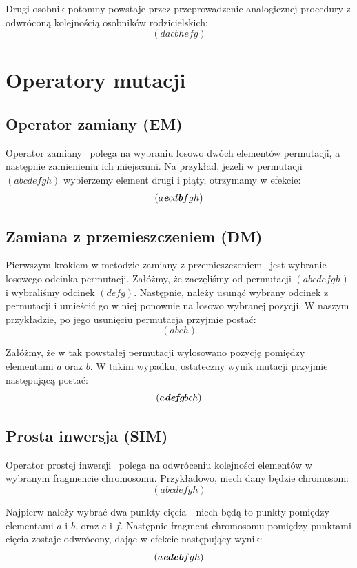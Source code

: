 \documentclass{xmgr}
\begin{document}
Drugi osobnik potomny powstaje przez przeprowadzenie analogicznej procedury z odwróconą kolejnością osobników rodzicielskich:
$$ (d a c b h e f g) $$


\section{Operatory mutacji}

\subsection{Operator zamiany (EM)}

Operator zamiany~\cite{Larranaga99geneticalgorithms} polega na wybraniu losowo dwóch elementów permutacji, a następnie zamienieniu ich miejscami. Na przykład, jeżeli w permutacji $ (a b c d e f g h) $ wybierzemy element drugi i piąty, otrzymamy w efekcie:
$$ (a \textit{\textbf{e}} c d \textit{\textbf{b}} f g h) $$

\subsection{Zamiana z przemieszczeniem (DM)}

Pierwszym krokiem w metodzie zamiany z przemieszczeniem~\cite{Michalewicz:2003:AGSDPE} jest wybranie losowego odcinka permutacji. Załóżmy, że zaczęliśmy od permutacji $ (a b c d e f g h) $ i wybraliśmy odcinek $ (d e f g) $. Następnie, należy usunąć wybrany odcinek z permutacji i umieścić go w niej ponownie na losowo wybranej pozycji. W naszym przykładzie, po jego usunięciu permutacja przyjmie postać:
$$ (a b c h) $$

Załóżmy, że w tak powstałej permutacji wylosowano pozycję pomiędzy elementami $a$ oraz $b$. W takim wypadku, ostateczny wynik mutacji przyjmie następującą postać:
$$ (a \textit{\textbf{defg}} b c h) $$

\subsection{Prosta inwersja (SIM)}

Operator prostej inwersji~\cite{Holland1975} polega na odwróceniu kolejności elementów w wybranym fragmencie chromosomu. Przykładowo, niech dany będzie chromosom:
$$ (a b c d e f g h) $$

Najpierw należy wybrać dwa punkty cięcia - niech będą to punkty pomiędzy elementami $a$ i $b$, oraz $e$ i $f$. Następnie fragment chromosomu pomiędzy punktami cięcia zostaje odwrócony, dając w efekcie następujący wynik:
$$ (a \textit{\textbf{edcb}} f g h) $$
\end{document}
